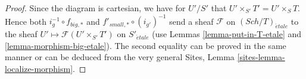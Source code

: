 \documentclass[10pt,a4paper]{amsart}
\theoremstyle{plain}
\theoremstyle{definition}
\theoremstyle{remark}
\numberwithin{equation}{subsection}
\def\Sch{\mathit{Sch}}
\def\etale{{\acute{e}tale}}
\begin{document}
\begin{proof}
Since the diagram is cartesian, we have for $U'/S'$
that $U' \times_{S'} T' = U' \times_S T$. Hence both
$i_g^{-1} \circ f_{big, *}$ and $f'_{small, *} \circ (i_{g'})^{-1}$
send a sheaf $\mathcal{F}$ on $(\Sch/T)_\etale$ to the sheaf
$U' \mapsto \mathcal{F}(U' \times_{S'} T')$ on $S'_\etale$
(use Lemmas \ref{lemma-put-in-T-etale} and \ref{lemma-morphism-big-etale}).
The second equality can be proved in the same manner or can be
deduced from the very general
Sites, Lemma \ref{sites-lemma-localize-morphism}.
\end{proof}
\end{document}
